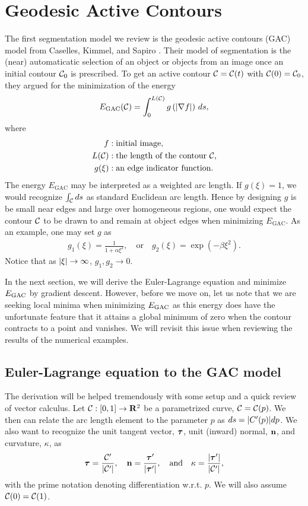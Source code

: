 \chapter{Geodesic Active Contours}
\label{ch:gac}
The first segmentation model we review is the geodesic active contours (GAC) model from Caselles, Kimmel, and Sapiro \cite{caselles1997geodesic}. Their model of segmentation is the (near) automaticatic selection of an object or objects from an image once an initial contour $\mathcal{C}_0$ is prescribed. To get an active contour $\mathcal{C} = \mathcal{C}(t)$ with $\mathcal{C}(0) = \mathcal{C}_0$, they argued for the minimization of the energy 
\begin{align}
E_\mathrm{GAC}(\mathcal{C}) = \int^{L(\mathcal{C})}_0 g\left( \lvert\nabla f \rvert \right) \, ds,
\label{eq:egac}
\end{align}
where 
\begin{align*}
f&: \textrm{initial image},
\\
L(\mathcal{C}) &: \textrm{the length of the contour $\mathcal{C}$,} 
\\ 
g(\xi)&: \textrm{an edge indicator function}.
\end{align*}
The energy $E_\textrm{GAC}$ may be interpreted as a weighted arc length. If $g(\xi) = 1$, we would recognize $\int_{\mathcal{C}}  ds$ as standard Euclidean arc length. Hence by designing $g$ is be small near edges and large over homogeneous regions, one would expect the contour $\mathcal{C}$ to be drawn to and remain at object edges when minimizing $E_\textrm{GAC}$. As an example, one may set $g$ as 
\begin{align*}
g_1(\xi) 
= \frac{1}{1 + \alpha\xi^2},
\quad\text{or}\quad 
g_2(\xi) 
= \exp(-\beta\xi^2).
\end{align*}
Notice that as $\lvert\xi\rvert \rightarrow \infty$, $g_1,g_2 \rightarrow 0$.  

In the next section, we will derive the Euler-Lagrange equation and minimize $E_\textrm{GAC}$ by gradient descent. However, before we move on, let us note that we are seeking local minima when minimizing $E_\textrm{GAC}$ as this energy does have the unfortunate feature that it attains a global minimum of zero when the contour contracts to a point and vanishes. We will revisit this issue when reviewing the results of the numerical examples.


\section{Euler-Lagrange equation to the GAC model}
The derivation will be helped tremendously with some setup and a quick review of vector calculus. Let $\mathcal{C}: [0,1]\rightarrow \mathbf{R}^2$ be a parametrized curve, $\mathcal{C} = \mathcal{C}(p)$. We then can relate the arc length element to the parameter $p$ as $ds = \lvert C'(p)\rvert dp$. We also want to recognize the unit tangent vector, $\boldsymbol{\tau}$, unit (inward) normal, $\mathbf{n}$, and curvature, $\kappa$, as 
\begin{align*}
\boldsymbol{\tau} 
= \frac{\mathcal{C}'}{\lvert\mathcal{C}'\rvert},\quad 
\mathbf{n} 
= \frac{ \boldsymbol{\tau} '}{\lvert\boldsymbol{\tau}'\rvert},
\quad\text{and}\quad 
\kappa = \frac{ \lvert\boldsymbol{\tau}'\rvert }{ \lvert \mathcal{C}' \rvert },
\end{align*}
with the prime notation denoting differentiation w.r.t. $p$. We will also assume $\mathcal{C}(0) = \mathcal{C}(1)$. 

